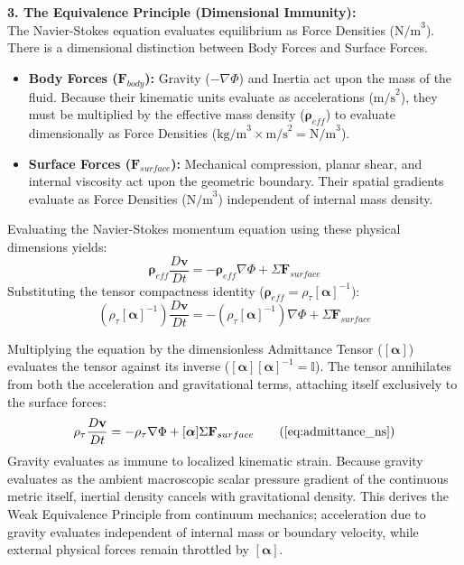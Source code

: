 \documentclass[11pt, a4paper]{article}
\begin{document}
\textbf{3. The Equivalence Principle (Dimensional Immunity):} \\
The Navier-Stokes equation evaluates equilibrium as Force Densities ($\text{N/m}^3$). There is a dimensional distinction between Body Forces and Surface Forces.
\begin{itemize}[nosep]
    \item \textbf{Body Forces ($\mathbf{F}_{body}$):} Gravity ($-\nabla \Phi$) and Inertia act upon the mass of the fluid. Because their kinematic units evaluate as accelerations ($\text{m/s}^2$), they must be multiplied by the effective mass density ($\boldsymbol{\rho}_{eff}$) to evaluate dimensionally as Force Densities ($\text{kg/m}^3 \times \text{m/s}^2 = \text{N/m}^3$).
    \item \textbf{Surface Forces ($\mathbf{F}_{surface}$):} Mechanical compression, planar shear, and internal viscosity act upon the geometric boundary. Their spatial gradients evaluate as Force Densities ($\text{N/m}^3$) independent of internal mass density.
\end{itemize}

Evaluating the Navier-Stokes momentum equation using these physical dimensions yields:
\begin{equation}
    \boldsymbol{\rho}_{eff} \frac{D\mathbf{v}}{Dt} = -\boldsymbol{\rho}_{eff} \nabla \Phi + \Sigma \mathbf{F}_{surface} \nonumber
\end{equation}
Substituting the tensor compactness identity ($\boldsymbol{\rho}_{eff} = \rho_{\tau} [\boldsymbol{\alpha}]^{-1}$):
\begin{equation}
    \left( \rho_{\tau} [\boldsymbol{\alpha}]^{-1} \right) \frac{D\mathbf{v}}{Dt} = -\left( \rho_{\tau} [\boldsymbol{\alpha}]^{-1} \right) \nabla \Phi + \Sigma \mathbf{F}_{surface} \nonumber
\end{equation}

Multiplying the equation by the dimensionless Admittance Tensor ($[\boldsymbol{\alpha}]$) evaluates the tensor against its inverse ($[\boldsymbol{\alpha}][\boldsymbol{\alpha}]^{-1} = \mathbb{I}$). The tensor annihilates from both the acceleration and gravitational terms, attaching itself exclusively to the surface forces:
\begin{equation}
    \rho_{\tau} \frac{D\mathbf{v}}{Dt} = -\rho_{\tau} \nabla \Phi + [\boldsymbol{\alpha}] \Sigma \mathbf{F}_{surface} \tag{\ref{eq:admittance_ns}}
\end{equation}
Gravity evaluates as immune to localized kinematic strain. Because gravity evaluates as the ambient macroscopic scalar pressure gradient of the continuous metric itself, inertial density cancels with gravitational density. This derives the Weak Equivalence Principle from continuum mechanics; acceleration due to gravity evaluates independent of internal mass or boundary velocity, while external physical forces remain throttled by $[\boldsymbol{\alpha}]$.
\end{document}
